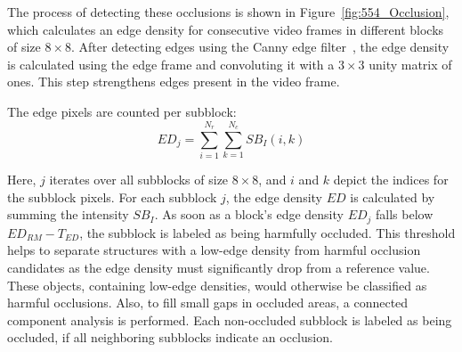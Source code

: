 The process of detecting these occlusions is shown in Figure~\ref{fig:554_Occlusion}, which calculates an edge density for consecutive video frames in different blocks of size $8\times8$.
After detecting edges using the Canny edge filter~\cite{Canny1986}, the edge density is calculated using the edge frame and convoluting it with a $3\times3$ unity matrix of ones.
This step strengthens edges present in the video frame.

The edge pixels are counted per subblock:
\begin{equation}
ED_{j} = \sum_{i=1}^{N_r}\displaystyle\sum_{k=1}^{N_c} SB_{I} (i,k)
\end{equation}

Here, $j$ iterates over all subblocks of size $8\times8$, and $i$ and $k$ depict the indices for the subblock pixels.
For each subblock $j$, the edge density $ED$ is calculated by summing the intensity $SB_I$.  
As soon as a block's edge density $ED_j$ falls below $ED_{RM} - T_{ED}$, the subblock is labeled as being harmfully occluded.
This threshold helps to separate structures with a low-edge density from harmful occlusion candidates as the edge density must significantly drop from a reference value. 
These objects, containing low-edge densities, would otherwise be classified as harmful occlusions.
Also, to fill small gaps in occluded areas, a connected component analysis is performed.
Each non-occluded subblock is labeled as being occluded, if all neighboring subblocks indicate an occlusion.  
